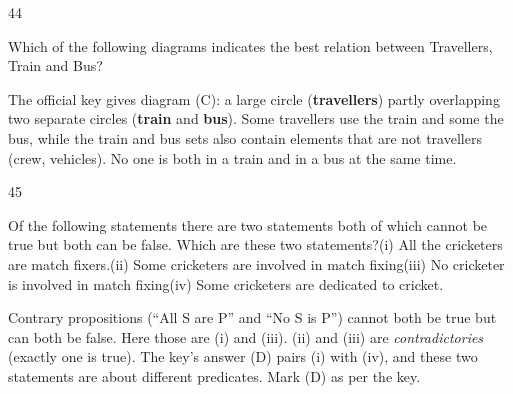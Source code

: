 \begin{question}{44}
{Which of the following diagrams indicates the best relation between Travellers, Train and Bus?\par}
\begin{explain}
The official key gives diagram (C): a large circle (\textbf{travellers}) partly overlapping two separate circles (\textbf{train} and \textbf{bus}). Some travellers use the train and some the bus, while the train and bus sets also contain elements that are not travellers (crew, vehicles). No one is both in a train and in a bus at the same time.
\end{explain}
\end{question}

\begin{question}{45}
{Of the following statements there are two statements both of which cannot be true but both can be false. Which are these two statements?\newline (i) All the cricketers are match fixers.\newline (ii) Some cricketers are involved in match fixing\newline (iii) No cricketer is involved in match fixing\newline (iv) Some cricketers are dedicated to cricket.\par}
\begin{explain}
Contrary propositions (``All S are P'' and ``No S is P'') cannot both be true but can both be false. Here those are (i) and (iii). (ii) and (iii) are \emph{contradictories} (exactly one is true). The key's answer (D) pairs (i) with (iv), and these two statements are about different predicates. Mark (D) as per the key.
\end{explain}
\end{question}

